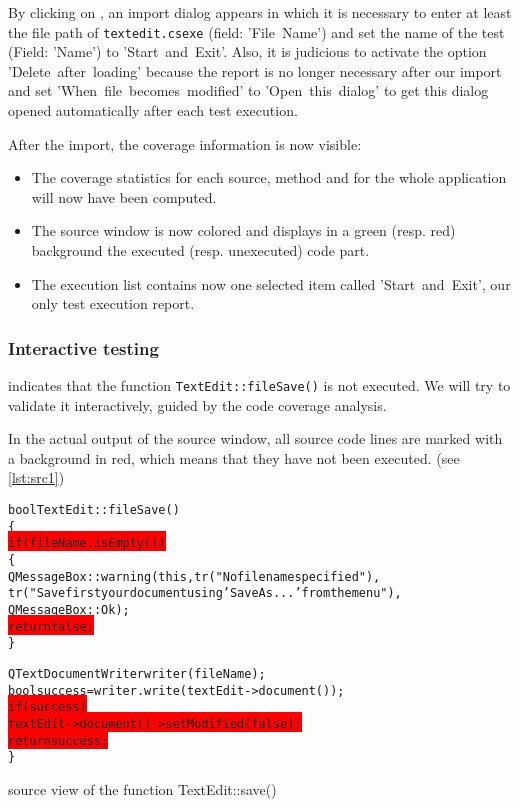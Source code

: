 By clicking on , 
an import dialog appears in which it is necessary to enter at least  the file path of
\verb$textedit.csexe$ (field: 'File~Name') and set  the name of the test (Field: 'Name') to
'\textsf{Start~and~Exit}'.  Also, it is judicious to activate the option
'Delete~after~loading' because the report is no longer necessary after our
import and set 'When~file~becomes~modified' to 'Open~this~dialog' to get this
dialog opened automatically after each test execution.

After the import, the coverage information is now visible:
\begin{itemize}
  \item The coverage statistics for each source, method and for the whole
    application will now have been computed.
  \item The source window is now colored and displays in a green (resp.
    red) background the executed (resp. unexecuted) code part.
  \item The execution list contains now one selected item called
    '\textsf{Start~and~Exit}', our only test execution report.
\end{itemize}

\subsubsection{Interactive testing}

{\CoverageBrowser} indicates that the function \verb$TextEdit::fileSave()$ is not executed.
We will try to validate it interactively, guided by the code coverage analysis.

In the actual output of the source window, all source code lines are marked
with a background in red, which means that they have not been executed. (see
    \autoref{lst:src1})

\begin{listings}[H]
  \scriptsize
\begin{alltt}
bool TextEdit::fileSave()
\{
\colorbox{red}{  if (fileName.isEmpty())}
  \{
    QMessageBox::warning(this,tr("No file name specified"),
      tr("Save first your document using 'Save As...' from the menu"),
      QMessageBox::Ok );
\colorbox{red}{    return false;}
   \}

  QTextDocumentWriter writer(fileName);
  bool success = writer.write(textEdit->document());
\colorbox{red}{  if (success)}
\colorbox{red}{     textEdit->document()->setModified(false);}
\colorbox{red}{  return success;}
\}
\end{alltt}
\caption{{\CoverageBrowser} source view of the function TextEdit::save()}
\label{lst:src1}
\end{listings}

